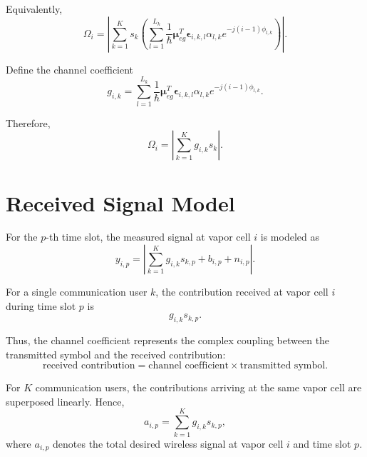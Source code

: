 \documentclass[12pt,a4paper]{article}
\begin{document}
Equivalently,
\begin{equation}
\Omega_i
=
\left|
\sum_{k=1}^{K}
 s_k
\left(
\sum_{l=1}^{L_k}
\frac{1}{\hbar}
\boldsymbol{\mu}_{eg}^{T}
\boldsymbol{\epsilon}_{i,k,l}
\alpha_{l,k}
 e^{-j(i-1)\phi_{l,k}}
\right)
\right|.
\tag{70}
\end{equation}

Define the channel coefficient
\begin{equation}
\boxed{
g_{i,k}
=
\sum_{l=1}^{L_k}
\frac{1}{\hbar}
\boldsymbol{\mu}_{eg}^{T}
\boldsymbol{\epsilon}_{i,k,l}
\alpha_{l,k}
e^{-j(i-1)\phi_{l,k}}
}.
\tag{71}
\end{equation}

Therefore,
\begin{equation}
\boxed{
\Omega_i
=
\left|
\sum_{k=1}^{K}
g_{i,k}s_k
\right|
}.
\tag{72}
\end{equation}

\section{Received Signal Model}

For the $p$-th time slot, the measured signal at vapor cell $i$ is
modeled as
\begin{equation}
\boxed{
y_{i,p}
=
\left|
\sum_{k=1}^{K}
g_{i,k}s_{k,p}
+
b_{i,p}
+
n_{i,p}
\right|
}.
\tag{73}
\end{equation}

For a single communication user $k$, the contribution received at
vapor cell $i$ during time slot $p$ is
\begin{equation}
g_{i,k}s_{k,p}.
\tag{74}
\end{equation}

Thus, the channel coefficient represents the complex coupling
between the transmitted symbol and the received contribution:
\begin{equation}
\text{received contribution}
=
\text{channel coefficient}
\times
\text{transmitted symbol}.
\tag{75}
\end{equation}

For $K$ communication users, the contributions arriving at the same
vapor cell are superposed linearly. Hence,
\begin{equation}
a_{i,p}
=
\sum_{k=1}^{K}
g_{i,k}s_{k,p},
\tag{76}
\end{equation}
where $a_{i,p}$ denotes the total desired wireless signal at vapor
cell $i$ and time slot $p$.
\end{document}
